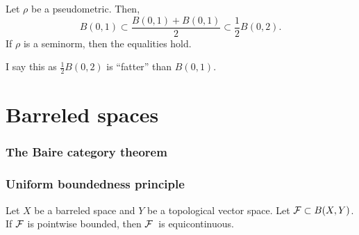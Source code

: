 \documentclass{../crs}
\begin{document}
\begin{prop}
Let $\rho$ be a pseudometric.
Then,
\[B(0,1)\subset\frac{B(0,1)+B(0,1)}2\subset\frac12B(0,2).\]
If $\rho$ is a seminorm, then the equalities hold.
\end{prop}
I say this as $\frac12B(0,2)$ is ``fatter'' than $B(0,1)$.







\chapter{Barreled spaces}

\subsection{The Baire category theorem}

\subsection{Uniform boundedness principle}
\begin{thm}
Let $X$ be a barreled space and $Y$ be a topological vector space.
Let $\mathcal{F}\subset B(X,Y)$.
If $\mathcal{F}$ is pointwise bounded, then $\mathcal{F}$\ is equicontinuous.
\end{thm}
\end{document}
